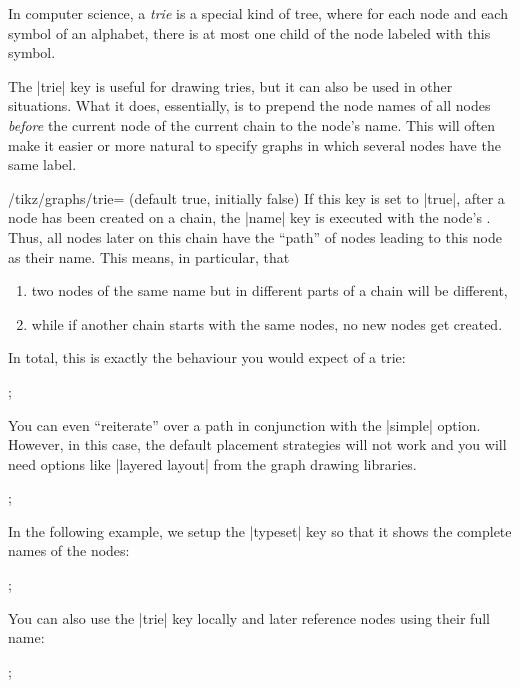 In computer science, a \emph{trie} is a special kind of tree, where
for each node and each symbol of an alphabet, there is at most one
child of the node labeled with this symbol.

The |trie| key is useful for drawing tries, but it can also be used in
other situations. What it does, essentially, is to prepend the node
names of all nodes \emph{before} the current node of the current chain
to the node's name. This will often make it easier or more natural to
specify graphs in which several nodes have the same label. 

\begin{key}{/tikz/graphs/trie= (default true, initially false)}
  If this key is set to |true|, after a node has been created on a
  chain, the |name| key is executed with the node's . Thus, all nodes later on this chain have the ``path'' of
  nodes leading to this node as their name. This means, in particular,
  that
  \begin{enumerate}
  \item two nodes of the same name but in different parts of a chain
    will be different,
  \item while if another chain starts with the same nodes, no new
    nodes get created.
  \end{enumerate}
  In total, this is exactly the behaviour you would expect of a trie:
\begin{codeexample}[]
\tikz {};
\end{codeexample}
  You can even ``reiterate'' over a path in conjunction with the
  |simple| option. However, in this case, the default placement
  strategies will not work and you will need options like
  |layered layout| from the graph drawing libraries.
\ifluatex  
\begin{codeexample}[]
\tikz {};
\end{codeexample}
  In the following example, we setup the |typeset| key so that it
  shows the complete names of the nodes:
\begin{codeexample}[]
\tikz {};
\end{codeexample}
\fi
  You can also use the |trie| key locally and later reference nodes
  using their full name:
\begin{codeexample}[]
\tikz {};
\end{codeexample}
\end{key}


